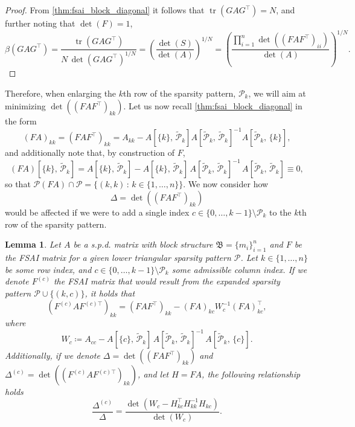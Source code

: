 \documentclass[a4paper]{article}
\DeclareMathOperator{\trace}{tr}
\theoremstyle{plain}
\newtheorem{lemma}{Lemma}[section]
\theoremstyle{definition}
\theoremstyle{remark}
\begin{document}
\begin{proof}
	From \cref{thm:fsai_block_diagonal} it follows that \(\trace(G A G^{\top}) = N\), and further noting that \(\det(F) = 1\),
	\begin{equation*}
		\beta(G A G^{\top}) = \frac{\trace(G A G^{\top})}{N \,\det(G A G^{\top})^{1/N}} = \left(\frac{\det(S)}{\det(A)}\right)^{1/N} = \left( \frac{\prod_{i=1}^n\det((F A F^{\top})_{ii})}{\det(A)} \right)^{1/N}.
	\end{equation*}
\end{proof}

Therefore, when enlarging the \(k\)th row of the sparsity pattern, \(\mathcal{P}_k\), we will aim at minimizing \(\det((F A F^{\top})_{kk})\). Let us now recall \cref{thm:fsai_block_diagonal} in the form
\begin{equation*}
	(FA)_{kk} = (FAF^{\top})_{kk} = A_{kk} - A[\{k\},\, \tilde{\mathcal{P}}_k] A[\tilde{\mathcal{P}}_k,\, \tilde{\mathcal{P}}_k]^{-1} A[\tilde{\mathcal{P}}_k,\, \{k\}],
\end{equation*}
and additionally note that, by construction of \(F\),
\begin{equation}\label{eq:fsai_helper}
	(FA)[\{k\},\, \tilde{\mathcal{P}}_k] = A[\{k\},\, \tilde{\mathcal{P}}_k] - A[\{k\},\, \tilde{\mathcal{P}}_k]\, A[\tilde{\mathcal{P}}_k,\, \tilde{\mathcal{P}}_k]^{-1} \, A[\tilde{\mathcal{P}}_k,\, \tilde{\mathcal{P}}_k] \equiv 0,
\end{equation}
so that \(\mathcal{P}(FA) \cap \mathcal{P} = \{(k, k)\,\colon\, k \in \{1,\dots,n\}\}\). We now consider how
\begin{equation*}
	\Delta = \det((F A F^{\top})_{kk})
\end{equation*}
would be affected if we were to add a single index \(c \in \{0,\dots,k-1\} \setminus \mathcal{P}_k\) to the \(k\)th row of the sparsity pattern.
\begin{lemma}\label{thm:fsai_adaptivity}
	Let \(A\) be a s.p.d. matrix with block structure \(\mathfrak{B} = \{m_i\}_{i=1}^n\) and \(F\) be the FSAI matrix for a given lower triangular sparsity pattern \(\mathcal{P}\). Let \(k \in \{1,\dots,n\}\) be some row index, and \(c \in \{0,\dots,k-1\} \setminus \mathcal{P}_k\) some admissible column index. If we denote \(F^{(c)}\) the FSAI matrix that would result from the expanded sparsity pattern \(\mathcal{P} \cup \{(k,c)\}\), it holds that
	\begin{equation*}
		(F^{(c)} A F^{(c)\top})_{kk} = (F A F^{\top})_{kk} - (FA)_{kc} W_c^{-1} (FA)^{\top}_{kc},
	\end{equation*}
	where
	\begin{equation*}
		W_c \coloneqq A_{cc} - A[\{c\},\, \tilde{\mathcal{P}}_k] \, A[\tilde{\mathcal{P}}_k,\, \tilde{\mathcal{P}}_k]^{-1}\, A[\tilde{\mathcal{P}}_k,\, \{c\}].
	\end{equation*}
	Additionally, if we denote \(\Delta = \det((F A F^{\top})_{kk})\) and \(\Delta^{(c)} = \det((F^{(c)} A F^{(c)\top})_{kk})\), and let \(H = FA\), the following relationship holds
	\begin{equation*}
		\frac{\Delta^{(c)}}{\Delta} = \frac{\det\left(W_c - H_{kc}^{\top} H_{kk}^{-1} H_{kc}\right)}{\det(W_c)}.
	\end{equation*}
\end{lemma}
\end{document}
